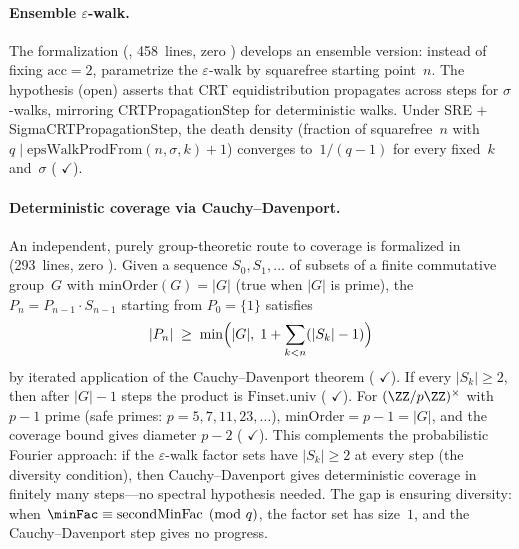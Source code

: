 \paragraph{Ensemble $\varepsilon$-walk.}
The formalization
(, 458~lines, zero )
develops an ensemble version: instead of fixing $\mathrm{acc} = 2$,
parametrize the $\varepsilon$-walk by squarefree starting point~$n$.
The  hypothesis (open) asserts that
CRT equidistribution propagates across steps for $\sigma$-walks,
mirroring CRTPropagationStep for deterministic walks.
Under SRE $+$ SigmaCRTPropagationStep, the death density (fraction of
squarefree~$n$ with $q \mid \mathrm{epsWalkProdFrom}(n,\sigma,k)+1$)
converges to~$1/(q{-}1)$ for every fixed~$k$ and~$\sigma$
(
{\color{leanink}$\checkmark$}).

\paragraph{Deterministic coverage via Cauchy--Davenport.}
An independent, purely group-theoretic route to coverage is formalized in
 (293~lines, zero ).
Given a sequence $S_0, S_1, \ldots$ of subsets of a finite commutative
group~$G$ with $\mathrm{minOrder}(G) = |G|$ (true when $|G|$ is prime),
the  $P_n = P_{n-1} \cdot S_{n-1}$ starting
from $P_0 = \{1\}$ satisfies
\[
  |P_n| \;\geq\; \min\Bigl(|G|,\; 1 + \sum_{k<n}(|S_k| - 1)\Bigr)
\]
by iterated application of the Cauchy--Davenport theorem
(
{\color{leanink}$\checkmark$}).
If every $|S_k| \geq 2$, then after $|G| - 1$ steps the product is
$\mathrm{Finset.univ}$
(
{\color{leanink}$\checkmark$}).
For $(\ZZ/p\ZZ)^\times$ with $p{-}1$ prime (safe primes: $p = 5, 7, 11, 23, \ldots$),
$\mathrm{minOrder} = p{-}1 = |G|$, and the coverage bound gives diameter
$p - 2$
(
{\color{leanink}$\checkmark$}).
This complements the probabilistic Fourier approach: if the
$\varepsilon$-walk factor sets have $|S_k| \geq 2$ at every step (the
diversity condition), then Cauchy--Davenport gives deterministic coverage
in finitely many steps---no spectral hypothesis needed.  The gap is
ensuring diversity: when $\minFac \equiv \operatorname{secondMinFac}
\pmod{q}$, the factor set has size~$1$, and the Cauchy--Davenport
step gives no progress.

